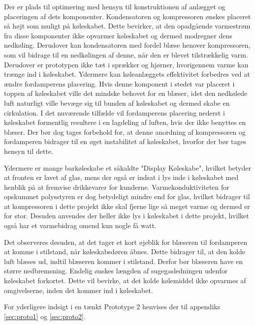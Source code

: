 \documentclass[../Hovedrapport.tex]{subfiles}
\begin{document}
Der er plads til optimering med hensyn til konstruktionen af anlægget og placeringen af dets komponenter. Kondensatoren og kompressoren ønskes placeret så højt som muligt på køleskabet. Dette bevirker, at den opadgående varmestrøm fra disse komponenter ikke opvarmer køleskabet og dermed modregner dens nedkøling. Derudover kan kondensatoren med fordel blæse henover kompressoren, som vil bidrage til en nedkølingen af denne, når den er blevet tilstrækkelig varm. Derudover er prototypen ikke tæt i sprækker og hjørner, hvorigennem varme kan trænge ind i køleskabet. Ydermere kan køleanlæggets effektivitet forbedres ved at ændre fordamperens placering. Hvis denne komponent i stedet var placeret i toppen af køleskabet ville det mindske behovet for en blæser, idet den nedkølede luft naturligt ville bevæge sig til bunden af køleskabet og dermed skabe en cirkulation. I det nuværende tilfælde vil fordamperens placering nederst i køleskabet formentlig resultere i en lagdeling af luften, hvis der ikke benyttes en blæser. Der bør dog tages forbehold for, at denne anordning af kompressoren og fordamperen bidrager til en øget instabilitet af køleskabet, hvorfor der bør tages hensyn til dette.

Ydermere er mange barkøleskabe et såkaldte "Display Køleskabe", hvilket betyder at fronten er lavet af glas, mens der også er indsat i lys inde i køleskabet med henblik på at fremvise drikkevarer for kunderne. Varmekonduktiviteten for opskummet polysstyren er dog betydeligt mindre end for glas, hvilket bidrager til at kompressoren i dette projekt ikke skal fjerne lige så meget varme og dermed er for stor. Desuden anvendes der heller ikke lys i køleskabet i dette projekt, hvilket også har et varmebidrag omend kun nogle få watt.
 
Det observeres desuden, at det tager et kort øjeblik for blæseren til fordamperen at komme i stilstand, når køleskabsdøren åbnes. Dette bidrager til, at den kolde luft blæses ud, indtil blæseren kommer i stilstand. Derfor bør blæseren have en større nedbremsning. Endelig ønskes længden af sugegasledningen udenfor køleskabet forkortet. Dette vil bevirke, at det kolde kølemiddel ikke opvarmes af omgivelserne, inden det kommer ind i køleskabet.

For yderligere indsigt i en tænkt Prototype 2 henvises der til appendiks \ref{sec:proto1} og \ref{sec:proto2}. 
\end{document}
